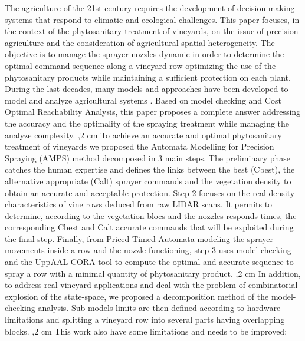 \documentclass[preprint,3p,times,twocolumn]{elsarticle}
\begin{document}
The agriculture of the 21st century requires the development of decision making systems that respond to climatic and ecological challenges. This paper focuses, in the context of the phytosanitary treatment of vineyards, on the issue of precision agriculture and the consideration of agricultural spatial heterogeneity. The objective is to manage the sprayer nozzles dynamic in order to determine the optimal command sequence along a vineyard row optimizing the use of the phytosanitary products while maintaining a sufficient protection on each plant. During the last decades, many models and approaches have been developed to model and analyze agricultural systems \cite{Model_2016}. Based on model checking and Cost Optimal Reachability Analysis, this paper proposes a complete answer addressing the accuracy and the optimality of the spraying treatment while managing the analyze complexity.
,2 cm
To achieve an accurate and optimal phytosanitary treatment of vineyards we proposed the Automata Modelling for Precision Spraying (AMPS) method decomposed in 3 main steps. The preliminary phase catches the human expertise and defines the links between the best (Cbest), the alternative appropriate (Calt) sprayer commands and the vegetation density to obtain an accurate and acceptable protection. Step 2 focuses on the real density characteristics of vine rows deduced from raw LIDAR scans. It permits to determine, according to the vegetation blocs and the nozzles responds times, the corresponding Cbest and Calt accurate commands that will be exploited during the final step. Finally, from Priced Timed Automata modeling the sprayer movements inside a row and the nozzle functioning, step 3 uses model checking and the UppAAL-CORA tool to compute the optimal and accurate sequence to spray a row with a minimal quantity of phytosanitary product.
,2 cm
In addition, to address real vineyard applications and deal with the problem of combinatorial explosion of the state-space, we proposed a decomposition method of the model-checking analysis. Sub-models limits are then defined according to hardware limitations and splitting a vineyard row into several parts having overlapping blocks.
,2 cm
This work also have some limitations and needs to be improved:
\end{document}
